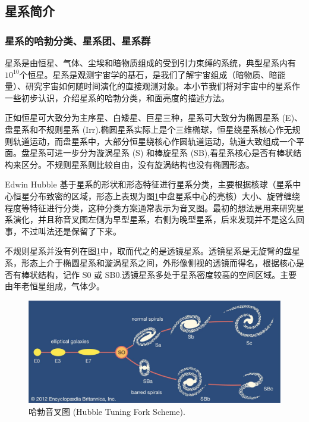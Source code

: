 \documentclass[../天体物理基础.tex]{subfiles}
\begin{document}
\subsection{星系简介}
\subsubsection{星系的哈勃分类、星系团、星系群}
星系是由恒星、气体、尘埃和暗物质组成的受到引力束缚的系统，典型星系内有$10^{10}$个恒星。星系是观测宇宙学的基石，是我们了解宇宙组成（暗物质、暗能量）、研究宇宙如何随时间演化的直接观测对象。本小节我们将对宇宙中的星系作一些初步认识，介绍星系的哈勃分类，和面亮度的描述方法。

正如恒星可大致分为主序星、白矮星、巨星三种，星系可大致分为椭圆星系 (E)、盘星系和不规则星系 (Irr).椭圆星系实际上是个三维椭球，恒星绕星系核心作无规则轨道运动，而盘星系中，大部分恒星绕核心作圆轨道运动，轨道大致组成一个平面。盘星系可进一步分为漩涡星系 (S) 和棒旋星系 (SB),看星系核心是否有棒状结构来区分。不规则星系则比较自由，没有旋涡结构也没有椭圆形态。

Edwin Hubble 基于星系的形状和形态特征进行星系分类，主要根据核球（星系中心恒星分布致密的区域，形态上表现为图\ref{哈勃音叉图。}中盘星系中心的亮核）大小、旋臂缠绕程度等特征进行分类，这种分类方案通常表示为音叉图。最初的想法是用来研究星系演化，并且称音叉图左侧为早型星系，右侧为晚型星系，后来发现并不是这么回事，不过叫法还是保留了下来。

不规则星系并没有列在图\ref{哈勃音叉图。}中，取而代之的是透镜星系。透镜星系是无旋臂的盘星系，形态上介于椭圆星系和漩涡星系之间，外形像侧视的透镜而得名，根据核心是否有棒状结构，记作 S0 或 SB0.透镜星系多处于星系密度较高的空间区域。主要由年老恒星组成，气体少。

\begin{figure}[!htbp]
\centering
\includegraphics[width=12cm]{figures/figure1_15.jpg}
\captionsetup{justification=raggedright, singlelinecheck=false}
\caption{哈勃音叉图 (Hubble Tuning Fork Scheme).}
\label{哈勃音叉图。}
\end{figure}
\end{document}
